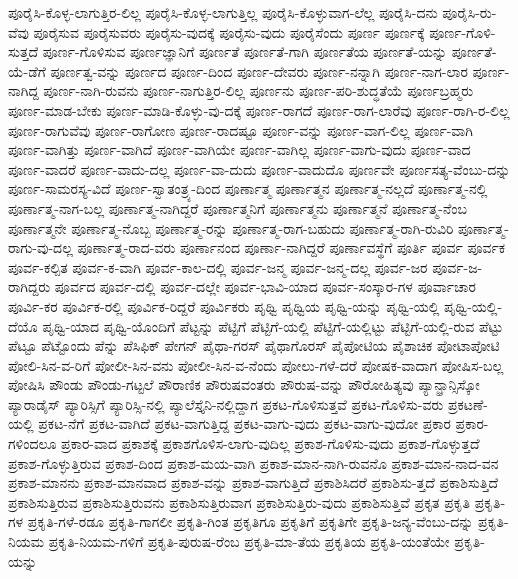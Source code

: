 {ಪೂರೈಸಿ-ಕೊಳ್ಳ-ಲಾಗುತ್ತಿರ-ಲಿಲ್ಲ
ಪೂರೈಸಿ-ಕೊಳ್ಳ-ಲಾಗುತ್ತಿಲ್ಲ
ಪೂರೈಸಿ-ಕೊಳ್ಳುವಾಗ-ಲೆಲ್ಲ
ಪೂರೈಸಿ-ದನು
ಪೂರೈಸಿ-ರು-ವೆವು
ಪೂರೈಸುವ
ಪೂರೈಸುವರು
ಪೂರೈಸು-ವುದಕ್ಕೆ
ಪೂರೈಸು-ವುದು
ಪೂರೈಸೆಂದು
ಪೂರ್ಣ
ಪೂರ್ಣಕ್ಕೆ
ಪೂರ್ಣ-ಗೊಳಿ-ಸುತ್ತದೆ
ಪೂರ್ಣ-ಗೊಳಿಸುವ
ಪೂರ್ಣಜ್ಞಾನಿಗೆ
ಪೂರ್ಣತೆ
ಪೂರ್ಣತೆ-ಗಾಗಿ
ಪೂರ್ಣತೆಯ
ಪೂರ್ಣತೆ-ಯನ್ನು
ಪೂರ್ಣತೆ-ಯೆ-ಡೆಗೆ
ಪೂರ್ಣತ್ವ-ವನ್ನು
ಪೂರ್ಣದ
ಪೂರ್ಣ-ದಿಂದ
ಪೂರ್ಣ-ದೇವರು
ಪೂರ್ಣ-ನನ್ನಾಗಿ
ಪೂರ್ಣ-ನಾಗ-ಲಾರ
ಪೂರ್ಣ-ನಾಗಿದ್ದ
ಪೂರ್ಣ-ನಾಗಿ-ರುವನು
ಪೂರ್ಣ-ನಾಗುತ್ತಿರ-ಲಿಲ್ಲ
ಪೂರ್ಣನು
ಪೂರ್ಣ-ಪರಿ-ಶುದ್ಧತೆಯೆ
ಪೂರ್ಣಬ್ರಹ್ಮರು
ಪೂರ್ಣ-ಮಾಡ-ಬೇಕು
ಪೂರ್ಣ-ಮಾಡಿ-ಕೊಳ್ಳು-ವು-ದಕ್ಕೆ
ಪೂರ್ಣ-ರಾಗದೆ
ಪೂರ್ಣ-ರಾಗ-ಲಾರೆವು
ಪೂರ್ಣ-ರಾಗಿ-ರ-ಲಿಲ್ಲ
ಪೂರ್ಣ-ರಾಗುವೆವು
ಪೂರ್ಣ-ರಾಗೋಣ
ಪೂರ್ಣ-ರಾದಷ್ಟೂ
ಪೂರ್ಣ-ವನ್ನು
ಪೂರ್ಣ-ವಾಗ-ಲಿಲ್ಲ
ಪೂರ್ಣ-ವಾಗಿ
ಪೂರ್ಣ-ವಾಗಿತ್ತು
ಪೂರ್ಣ-ವಾಗಿದೆ
ಪೂರ್ಣ-ವಾಗಿಯೇ
ಪೂರ್ಣ-ವಾಗಿಲ್ಲ
ಪೂರ್ಣ-ವಾಗು-ವುದು
ಪೂರ್ಣ-ವಾದ
ಪೂರ್ಣ-ವಾದರೆ
ಪೂರ್ಣ-ವಾದು-ದಲ್ಲ
ಪೂರ್ಣ-ವಾ-ದುದು
ಪೂರ್ಣ-ವಾದುದೊ
ಪೂರ್ಣವೇ
ಪೂರ್ಣಸತ್ಯ-ವೆಂಬು-ದನ್ನು
ಪೂರ್ಣ-ಸಾಮರಸ್ಯ-ವಿದೆ
ಪೂರ್ಣ-ಸ್ವಾತಂತ್ರ್ಯ-ದಿಂದ
ಪೂರ್ಣಾತ್ಮ
ಪೂರ್ಣಾತ್ಮನ
ಪೂರ್ಣಾತ್ಮ-ನಲ್ಲದೆ
ಪೂರ್ಣಾತ್ಮ-ನಲ್ಲಿ
ಪೂರ್ಣಾತ್ಮ-ನಾಗ-ಬಲ್ಲ
ಪೂರ್ಣಾತ್ಮ-ನಾಗಿದ್ದರೆ
ಪೂರ್ಣಾತ್ಮನಿಗೆ
ಪೂರ್ಣಾತ್ಮನು
ಪೂರ್ಣಾತ್ಮನೆ
ಪೂರ್ಣಾತ್ಮ-ನೆಂಬ
ಪೂರ್ಣಾತ್ಮನೇ
ಪೂರ್ಣಾತ್ಮ-ನೊಬ್ಬ
ಪೂರ್ಣಾತ್ಮ-ರನ್ನು
ಪೂರ್ಣಾತ್ಮ-ರಾಗ-ಬಹುದು
ಪೂರ್ಣಾತ್ಮ-ರಾಗಿ-ರುವಿರಿ
ಪೂರ್ಣಾತ್ಮ-ರಾಗು-ವು-ದಲ್ಲ
ಪೂರ್ಣಾತ್ಮ-ರಾದ-ವರು
ಪೂರ್ಣಾನಂದ
ಪೂರ್ಣಾ-ನಾಗಿದ್ದರೆ
ಪೂರ್ಣಾವಸ್ಥೆಗೆ
ಪೂರ್ತಿ
ಪೂರ್ವ
ಪೂರ್ವಕ
ಪೂರ್ವ-ಕಲ್ಪಿತ
ಪೂರ್ವ-ಕ-ವಾಗಿ
ಪೂರ್ವ-ಕಾಲ-ದಲ್ಲಿ
ಪೂರ್ವ-ಜನ್ಮ
ಪೂರ್ವ-ಜನ್ಮ-ದಲ್ಲ
ಪೂರ್ವ-ಜರ
ಪೂರ್ವ-ಜ-ರಾಗಿದ್ದರು
ಪೂರ್ವದ
ಪೂರ್ವ-ದಲ್ಲಿ
ಪೂರ್ವ-ದಲ್ಲೇ
ಪೂರ್ವ-ಭಾವಿ-ಯಾದ
ಪೂರ್ವ-ಸಂಸ್ಕಾರ-ಗಳ
ಪೂರ್ವಾಚಾರ
ಪೂರ್ವಿ-ಕರ
ಪೂರ್ವಿಕ-ರಲ್ಲಿ
ಪೂರ್ವಿಕ-ರಿದ್ದರೆ
ಪೂರ್ವಿಕರು
ಪೃಥ್ವಿ
ಪೃಥ್ವಿಯ
ಪೃಥ್ವಿ-ಯನ್ನು
ಪೃಥ್ವಿ-ಯಲ್ಲಿ
ಪೃಥ್ವಿ-ಯಲ್ಲಿ-ದೆಯೊ
ಪೃಥ್ವಿ-ಯಾದ
ಪೃಥ್ವಿ-ಯೊಂದಿಗೆ
ಪೆಟ್ಟನ್ನು
ಪೆಟ್ಟಿಗೆ
ಪೆಟ್ಟಿಗೆ-ಯಲ್ಲಿ
ಪೆಟ್ಟಿಗೆ-ಯಲ್ಲಿಟ್ಟು
ಪೆಟ್ಟಿಗೆ-ಯಲ್ಲಿ-ರುವ
ಪೆಟ್ಟು
ಪೆಟ್ಟೂ
ಪೆಟ್ಟೊಂದು
ಪೆನ್ನು
ಪೆಸಿಫಿಕ್
ಪೇಗನ್
ಪೈಥಾ-ಗರಸ್
ಪೈಥಾಗೊರಸ್
ಪೈಪೋಟಿಯ
ಪೈಶಾಚಿಕ
ಪೋಟಾಪೋಟಿ
ಪೋಲಿ-ಸಿನ-ವ-ರಿಗೆ
ಪೋಲೀ-ಸಿನ-ವನು
ಪೋಲೀ-ಸಿನ-ವ-ನೆಂದು
ಪೋಲು-ಗಳೆ-ದರೆ
ಪೋಷಕ-ವಾದಾಗ
ಪೋಷಿಸ-ಬಲ್ಲ
ಪೋಷಿಸಿ
ಪೌಂಡು
ಪೌಂಡು-ಗಟ್ಟಲೆ
ಪೌರಾಣಿಕ
ಪೌರುಷವಂತರು
ಪೌರುಷ-ವನ್ನು
ಪೌರೋಹಿತ್ಯವು
ಪ್ಯಾನ್ಫ್ರಾನ್ಸಿಸ್ಕೋ
ಪ್ಯಾರಾಡೈಸ್
ಪ್ಯಾರಿಸ್ಸಿಗೆ
ಪ್ಯಾರಿಸ್ಸಿ-ನಲ್ಲಿ
ಪ್ಯಾಲೆಸ್ತೈನಿ-ನಲ್ಲಿದ್ದಾಗ
ಪ್ರಕಟ-ಗೊಳಿಸುತ್ತವೆ
ಪ್ರಕಟ-ಗೊಳಿಸು-ವರು
ಪ್ರಕಟಣೆ-ಯಲ್ಲಿ
ಪ್ರಕಟ-ನೆಗೆ
ಪ್ರಕಟ-ವಾಗಿದೆ
ಪ್ರಕಟ-ವಾಗುತ್ತಿದ್ದ
ಪ್ರಕಟ-ವಾಗು-ವುದು
ಪ್ರಕಟ-ವಾಗು-ವುದೋ
ಪ್ರಕಾರ
ಪ್ರಕಾರ-ಗಳಿಂದಲೂ
ಪ್ರಕಾರ-ವಾದ
ಪ್ರಕಾಶಕ್ಕೆ
ಪ್ರಕಾಶಗೊಳಿಸ-ಲಾಗು-ವುದಿಲ್ಲ
ಪ್ರಕಾಶ-ಗೊಳಿಸು-ವುದು
ಪ್ರಕಾಶ-ಗೊಳ್ಳುತ್ತದೆ
ಪ್ರಕಾಶ-ಗೊಳ್ಳುತ್ತಿರುವ
ಪ್ರಕಾಶ-ದಿಂದ
ಪ್ರಕಾಶ-ಮಯ-ವಾಗಿ
ಪ್ರಕಾಶ-ಮಾನ-ನಾಗಿ-ರುವನೊ
ಪ್ರಕಾಶ-ಮಾನ-ನಾದ-ವನ
ಪ್ರಕಾಶ-ಮಾನನು
ಪ್ರಕಾಶ-ಮಾನವಾದ
ಪ್ರಕಾಶ-ವನ್ನು
ಪ್ರಕಾಶ-ವಾಗುತ್ತಿದೆ
ಪ್ರಕಾಶಿಸಿದರೆ
ಪ್ರಕಾಶಿಸು-ತ್ತದೆ
ಪ್ರಕಾಶಿಸುತ್ತಿದೆ
ಪ್ರಕಾಶಿಸುತ್ತಿರುವ
ಪ್ರಕಾಶಿಸುತ್ತಿರುವನು
ಪ್ರಕಾಶಿಸುತ್ತಿರುವಾಗ
ಪ್ರಕಾಶಿಸುತ್ತಿರು-ವುದು
ಪ್ರಕಾಶಿಸುತ್ತಿವೆ
ಪ್ರಕೃತ
ಪ್ರಕೃತಿ
ಪ್ರಕೃತಿ-ಗಳ
ಪ್ರಕೃತಿ-ಗಳೆ-ರಡೂ
ಪ್ರಕೃತಿ-ಗಾಗಲೀ
ಪ್ರಕೃತಿ-ಗಿಂತ
ಪ್ರಕೃತಿಗೂ
ಪ್ರಕೃತಿಗೆ
ಪ್ರಕೃತಿಗೇ
ಪ್ರಕೃತಿ-ಜನ್ಯ-ವೆಂಬು-ದನ್ನು
ಪ್ರಕೃತಿ-ನಿಯಮ
ಪ್ರಕೃತಿ-ನಿಯಮ-ಗಳಿಗೆ
ಪ್ರಕೃತಿ-ಪುರುಷ-ರೆಂಬ
ಪ್ರಕೃತಿ-ಮಾ-ತೆಯ
ಪ್ರಕೃತಿಯ
ಪ್ರಕೃತಿ-ಯಂತೆಯೇ
ಪ್ರಕೃತಿ-ಯನ್ನು
}
